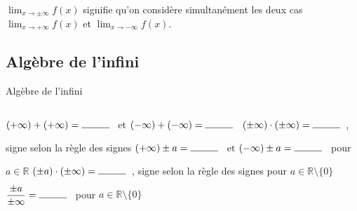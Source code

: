 \documentclass[a4paper,12pt]{article}
\begin{document}
\begin{remarque}
	\tcblower
 \(\displaystyle{\lim_{x\to\pm\infty}f(x)}\) signifie qu'on considère simultanément les deux cas \(\displaystyle{\lim_{x\to+\infty}f(x)}\) et \(\displaystyle{\lim_{x\to-\infty}f(x)}\).
\end{remarque}

\subsection{Algèbre de l'infini}
\begin{formule}[label=form:inf]
	Algèbre de l'infini
	\tcblower
	\begin{tasks}
		\task[] $(+\infty)+(+\infty)=\ligne{1}$ et $(-\infty)+(-\infty)=\ligne{1}$
		\task[] $(\pm \infty)\cdot (\pm\infty)=\ligne{1}$, signe selon la règle des signes
		\task[] $(+\infty)\pm a=\ligne{1}$ et $(-\infty)\pm a=\ligne{1}$ pour $a\in \mathbb{R}$
		\task[] $(\pm a)\cdot (\pm \infty)=\ligne{1}$, signe selon la règle des signes pour $a\in \mathbb{R}\setminus\{0\}$
		\task[]   $\dfrac{\pm a}{\pm\infty}=\ligne{1}$ pour $a\in \mathbb{R}\setminus\{0\}$
	\end{tasks}
\end{formule}
\end{document}

